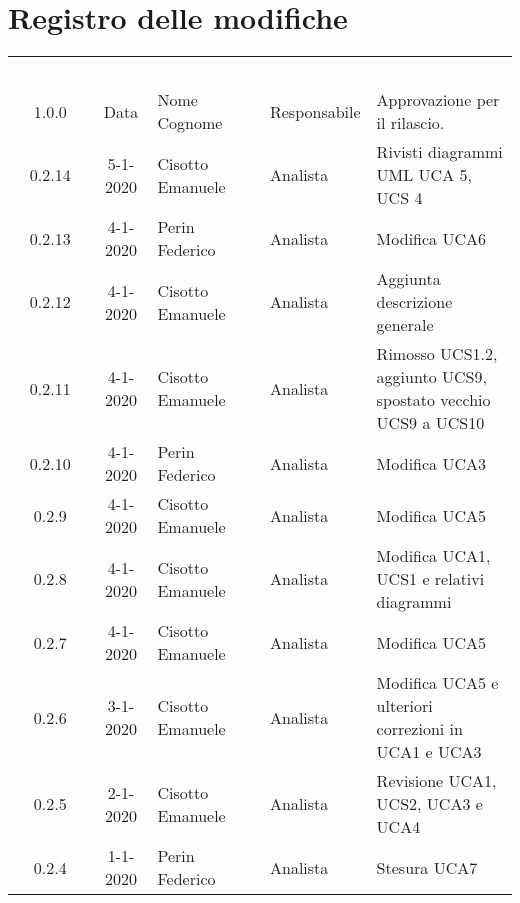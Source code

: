 \section*{Registro delle modifiche}
{
\renewcommand{\arraystretch}{1.5}
\centering
\begin{longtable}{ c c  C{4cm}  C{3cm} C{4cm}}
\textcolor{white}{\textbf{Versione}} & \textcolor{white}{\textbf{Data}} & \textcolor{white}{\textbf{Nominativo}} & \textcolor{white}{\textbf{Ruolo}} & \textcolor{white}{\textbf{Descrizione}}\\	


1.0.0 & Data & Nome Cognome & Responsabile & Approvazione per il rilascio.  \\

0.2.14 & 5-1-2020 & Cisotto Emanuele & Analista & Rivisti diagrammi UML UCA 5, UCS 4 \\

0.2.13 & 4-1-2020 & Perin Federico & Analista & Modifica UCA6 \\

0.2.12 & 4-1-2020 & Cisotto Emanuele & Analista & Aggiunta descrizione generale \\

0.2.11 & 4-1-2020 & Cisotto Emanuele & Analista & Rimosso UCS1.2, aggiunto UCS9, spostato vecchio UCS9 a UCS10 \\

0.2.10 & 4-1-2020 & Perin Federico & Analista & Modifica UCA3 \\

0.2.9 & 4-1-2020 & Cisotto Emanuele & Analista & Modifica UCA5 \\

0.2.8 & 4-1-2020 & Cisotto Emanuele & Analista & Modifica UCA1, UCS1 e relativi diagrammi \\

0.2.7 & 4-1-2020 & Cisotto Emanuele & Analista & Modifica UCA5 \\

0.2.6 & 3-1-2020 & Cisotto Emanuele & Analista & Modifica UCA5 e ulteriori correzioni in UCA1 e UCA3 \\

0.2.5 & 2-1-2020 & Cisotto Emanuele & Analista & Revisione UCA1, UCS2, UCA3 e UCA4 \\

0.2.4 & 1-1-2020 & Perin Federico & Analista & Stesura UCA7 \\


\end{longtable}}
